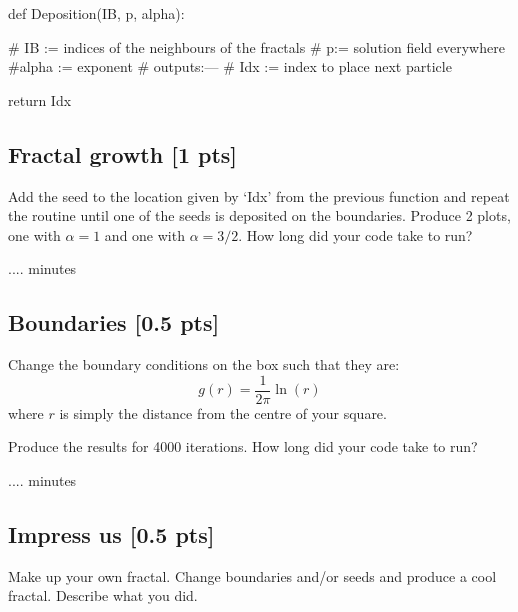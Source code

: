 \documentclass[paper=a4, fontsize=12pt]{scrartcl} %
\numberwithin{equation}{section}       %
\numberwithin{figure}{section}         %
\numberwithin{table}{section}          %
\begin{document}
 \begin{tcolorbox}
\begin{python}
def Deposition(IB, p, alpha):
    
    # IB := indices of the neighbours of the fractals
    # p:= solution field everywhere
    #alpha := exponent
    # outputs:---
    # Idx := index to place next particle

    return Idx 
\end{python}
 \end{tcolorbox}
 



% 
% 
 
 \subsection{Fractal growth [1 pts] }
Add the seed to the  location given by `Idx' from the previous function and repeat the routine until one of the seeds is deposited on the boundaries. Produce 2 plots, one with $\alpha=1$ and one with $\alpha=3/2$.
How long did your code take to run?
 \begin{tcolorbox}
 .... minutes
 \end{tcolorbox}

 \subsection{Boundaries [0.5 pts]  }
Change the boundary conditions on the box such that they are:
\begin{equation}
 g(r)=\frac{1}{2 \pi}\ln(r)
\end{equation}
where $r$ is simply the distance from the centre of your square. 

Produce the results for 4000 iterations.
How long did your code take to run?


 \begin{tcolorbox}
 .... minutes
 \end{tcolorbox}
 
  \subsection{Impress us [0.5 pts]  }
  Make up your own fractal. Change boundaries and/or seeds and produce a cool fractal. Describe what you did.
 
\end{document}

